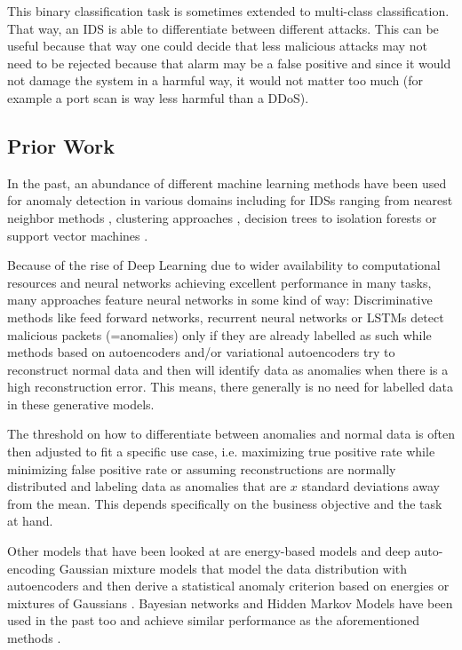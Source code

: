 \documentclass[]{article}
\begin{document}
	 This binary classification task is sometimes extended to multi-class classification. That way, an IDS is able to differentiate between different attacks. This can be useful because that way one could decide that less malicious attacks may not need to be rejected because that alarm may be a false positive and since it would not damage the system in a harmful way, it would not matter too much (for example a port scan is way less harmful than a DDoS).

	\subsection{Prior Work}
	 In the past, an abundance of different machine learning methods have been used for anomaly detection in various domains including for IDSs ranging from nearest neighbor methods \cite{5377998}, clustering approaches \cite{4244796}, decision trees \cite{6511281} to isolation forests \cite{DING201312} or support vector machines \cite{1234567}. 
	 \newline
	 
	 \noindent
	 Because of the rise of Deep Learning due to wider availability to computational resources and neural networks achieving excellent performance in many tasks, many approaches feature neural networks in some kind of way: Discriminative methods like feed forward networks, recurrent neural networks or LSTMs detect malicious packets (=anomalies) only if they are already labelled as such while methods based on autoencoders and/or variational autoencoders try to reconstruct normal data and then will identify data as anomalies when there is a high reconstruction error. This means, there generally is no need for labelled data in these generative models. 
	 
	 The threshold on how to differentiate between anomalies and normal data is often then adjusted to fit a specific use case, i.e. maximizing true positive rate while minimizing false positive rate or assuming reconstructions are normally distributed and labeling data as anomalies that are $x$ standard deviations away from the mean. This depends specifically on the business objective and the task at hand.
	 \newline
	 
	 \noindent
	 Other models that have been looked at are energy-based models and deep auto-encoding Gaussian mixture models that model the data distribution with autoencoders and then derive a statistical anomaly criterion based on energies or mixtures of Gaussians \cite{https://doi.org/10.48550/arxiv.1812.02288}. Bayesian networks and Hidden Markov Models have been used in the past too and achieve similar performance as the aforementioned methods \cite{inproceedings}.
	 \newline
	 
\end{document}
